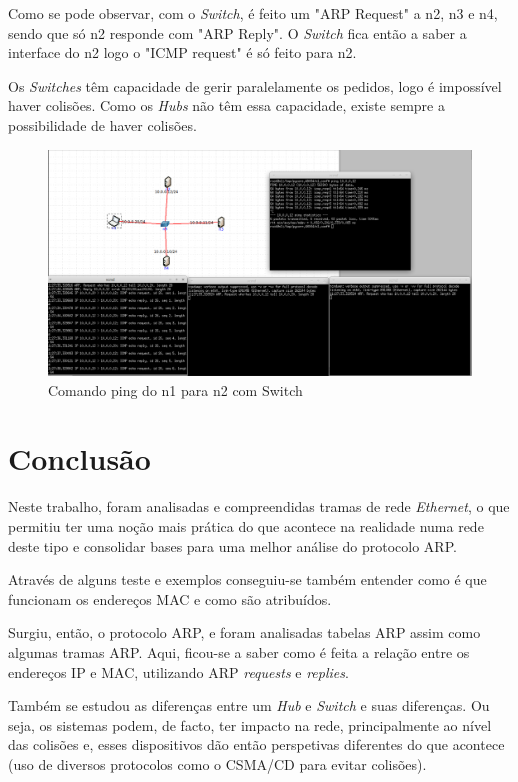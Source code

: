 \documentclass{llncs}
\begin{document}
Como se pode observar, com o \textit{Switch}, é feito um "ARP Request" a n2, n3 e n4, sendo que só n2 responde com "ARP Reply". 
O \textit{Switch} fica então a saber a interface do n2 logo o "ICMP request" é só feito para n2. 

Os \textit{Switches} têm capacidade de gerir paralelamente os pedidos, logo é impossível haver colisões. 
Como os \textit{Hubs} não têm essa capacidade, existe sempre a possibilidade de haver colisões.

\begin{figure}[H]
\begin{center}
\includegraphics[width=13cm]{ex618.PNG}
\end{center}
\caption{Comando ping do n1 para n2 com Switch}
\end{figure}

\section{Conclusão}
\hspace{3mm}

Neste trabalho, foram analisadas e compreendidas tramas de rede \textit{Ethernet}, o que permitiu ter uma noção mais prática do que acontece na realidade numa rede deste tipo e consolidar bases para uma melhor análise do protocolo ARP.

Através de alguns teste e exemplos conseguiu-se também entender como é que funcionam os endereços MAC e como são atribuídos.

Surgiu, então, o protocolo ARP, e foram analisadas tabelas ARP assim como algumas tramas ARP. Aqui, ficou-se a saber como é feita a relação entre os endereços IP e MAC, utilizando ARP \textit{requests} e \textit{replies}.

Também se estudou as diferenças entre um \textit{Hub} e \textit{Switch} e suas diferenças. Ou seja, os sistemas podem, de facto, ter impacto na rede, principalmente ao nível das colisões e, esses dispositivos dão então perspetivas diferentes do que acontece (uso de diversos protocolos como o CSMA/CD para evitar colisões).

\end{document}
